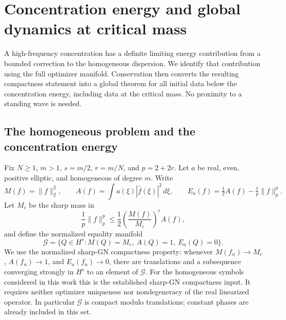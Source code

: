 \section{Concentration energy and global dynamics at critical mass}
\label{sec:r11-variational}

A high-frequency concentration has a definite limiting energy contribution
from a bounded correction to the homogeneous dispersion.  We identify
that contribution using the full optimizer manifold.  Conservation then
converts the resulting compactness statement into a global theorem for
all initial data below the concentration energy, including data at the
critical mass.  No proximity to a standing wave is needed.

\subsection{The homogeneous problem and the concentration energy}

Fix $N\ge1$, $m>1$, $s=m/2$, $r=m/N$, and $p=2+2r$.
Let $a$ be real, even, positive elliptic, and homogeneous of degree $m$.
Write
\[
 M(f)=\|f\|_2^2,\qquad
 A(f)=\int a(\xi)|\widehat f(\xi)|^2\,d\xi,\qquad
 E_a(f)=\tfrac12 A(f)-\tfrac1p\|f\|_p^p.
\]
Let $M_c$ be the sharp mass in
\begin{equation}\label{eq:r11-sharp-gn}
 \frac1p\|f\|_p^p\le
 \frac12\left(\frac{M(f)}{M_c}\right)^r A(f),
\end{equation}
and define the normalized equality manifold
\[
 \mathcal G=\{Q\in H^s:M(Q)=M_c,\ A(Q)=1,\ E_a(Q)=0\}.
\]
We use the normalized sharp-GN compactness property: whenever
$M(f_n)\to M_c$, $A(f_n)\to1$, and $E_a(f_n)\to0$, there are
translations and a subsequence converging strongly in $H^s$ to an
element of $\mathcal G$.  For the homogeneous symbols considered in
this work this is the established sharp-GN compactness input.  It
requires neither optimizer uniqueness nor nondegeneracy of the real
linearized operator.  In particular $\mathcal G$ is compact modulo
translations; constant phases are already included in this set.

